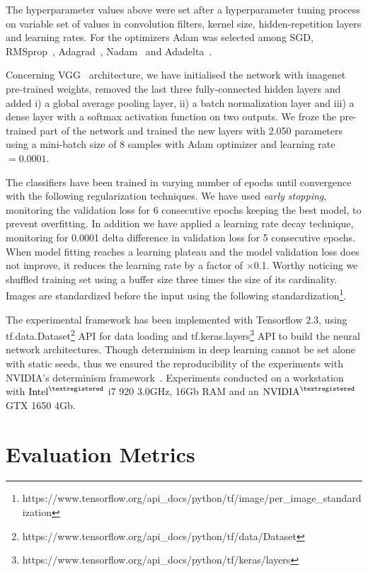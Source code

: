 The hyperparameter values above were set after a hyperparameter tuning process on variable set of values in convolution filters, kernel size, hidden-repetition layers and learning rates. For the optimizers Adam\cite{kingma2014adam} was selected among SGD, RMSprop~\cite{hinton2012practical}, Adagrad~\cite{duchi2011adaptive}, Nadam~\cite{dozat2016incorporating} and Adadelta~\cite{zeiler2012adadelta}.

Concerning VGG~\cite{simonyan2014very} architecture, we have initialised the network with imagenet~\cite{krizhevsky2012imagenet} pre-trained weights, removed the last three fully-connected hidden layers and added i) a global average pooling layer, ii) a batch normalization layer and iii) a dense layer with a softmax activation function on two outputs. We froze the pre-trained part of the network and trained the new layers with 2.050 parameters using a mini-batch size of 8 samples with Adam optimizer and learning rate$=0.0001$.

The classifiers have been trained in varying number of epochs until convergence with the following regularization techniques. We have used \textit{early stopping}, monitoring the validation loss for 6 consecutive epochs keeping the best model, to prevent overfitting. 
In addition we have applied a learning rate decay technique, monitoring for 0.0001 delta difference in validation loss for 5 consecutive epochs. When model fitting reaches a learning plateau and the model validation loss does not improve, it reduces the learning rate by a factor of $\times$0.1. 
Worthy noticing we shuffled training set using a buffer size three times the size of its cardinality. 
Images are standardized before the input using the following standardization\footnote{https://www.tensorflow.org/api\_docs/python/tf/image/per\_image\_standardization}.

The experimental framework has been implemented with Tensorflow 2.3, using tf.data.Dataset\footnote{https://www.tensorflow.org/api\_docs/python/tf/data/Dataset} API for data loading and tf.keras.layers\footnote{https://www.tensorflow.org/api\_docs/python/tf/keras/layers} API to build the neural network architectures. Though determinism in deep learning cannot be set alone with static seeds, thus we ensured the reproducibility of the experiments with NVIDIA's determinism framework~\cite{nvidiadet}. Experiments conducted on a workstation with $\text{Intel}^{\textregistered}$ i7 920 3.0GHz, 16Gb RAM and an $\text{NVIDIA}^{\textregistered}$ GTX 1650 4Gb.

\section{Evaluation Metrics}

